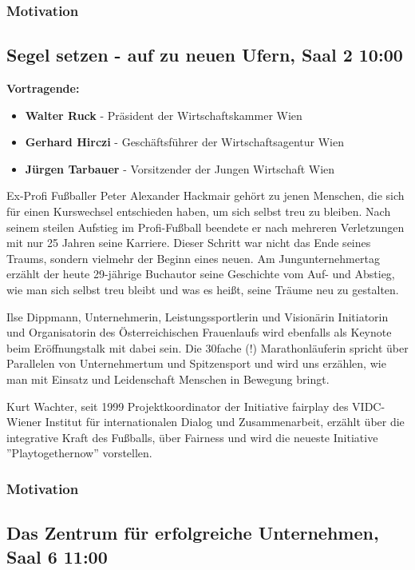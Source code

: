 \subsubsection{Motivation}
\newpage
\subsection{Segel setzen - auf zu neuen Ufern, Saal 2 10:00}

\textbf{Vortragende:}
\begin{itemize}
	\item \textbf{Walter Ruck} - Präsident der Wirtschaftskammer Wien
	\item \textbf{Gerhard Hirczi} - Geschäftsführer der Wirtschaftsagentur Wien
	\item \textbf{Jürgen Tarbauer} - Vorsitzender der Jungen Wirtschaft Wien
\end{itemize}

Ex-Profi Fußballer Peter Alexander Hackmair gehört zu jenen Menschen, die sich für einen Kurswechsel entschieden haben, um sich selbst treu zu bleiben. Nach seinem steilen Aufstieg im Profi-Fußball beendete er nach mehreren Verletzungen mit nur 25 Jahren seine Karriere. Dieser Schritt war nicht das Ende seines Traums, sondern vielmehr der Beginn eines neuen. Am Jungunternehmertag erzählt der heute 29-jährige Buchautor seine Geschichte vom Auf- und Abstieg, wie man sich selbst treu bleibt und was es heißt, seine Träume neu zu gestalten.

Ilse Dippmann, Unternehmerin, Leistungssportlerin und Visionärin Initiatorin und Organisatorin des Österreichi­schen Frauenlaufs wird ebenfalls als Keynote beim Eröffnungstalk mit dabei sein. Die 30fache (!) Marathonläuferin spricht über Parallelen von Unternehmertum und Spitzensport und wird uns erzählen, wie man mit Einsatz und Leidenschaft Menschen in Bewegung bringt.

Kurt Wachter, seit 1999 Projektkoordinator der Initiative fairplay des VIDC- Wiener Institut für internationalen Dialog und Zusammenarbeit, erzählt über die integrative Kraft des Fußballs, über Fairness und wird die neueste Initiative ''Playtogethernow'' vorstellen.
\subsubsection{Motivation}

\subsection{Das Zentrum für erfolgreiche Unternehmen, Saal 6 11:00}

